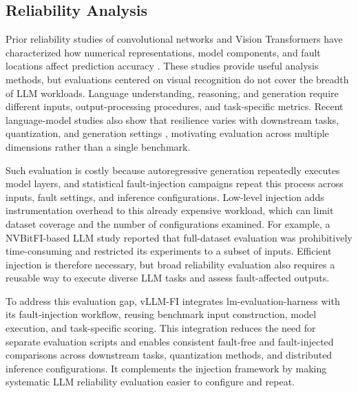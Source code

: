 \subsection{Reliability Analysis}

Prior reliability studies of convolutional networks and Vision Transformers have characterized how numerical representations, model components, and fault locations affect prediction accuracy \cite{li2017understanding,mahmoud2020hardnn,xue2023soft,roquet2024cross}. These studies provide useful analysis methods, but evaluations centered on visual recognition do not cover the breadth of LLM workloads. Language understanding, reasoning, and generation require different inputs, output-processing procedures, and task-specific metrics. Recent language-model studies also show that resilience varies with downstream tasks, quantization, and generation settings \cite{agarwal2023resilience,sun2025demystifying,xie2025realm}, motivating evaluation across multiple dimensions rather than a single benchmark.

Such evaluation is costly because autoregressive generation repeatedly executes model layers, and statistical fault-injection campaigns repeat this process across inputs, fault settings, and inference configurations. Low-level injection adds instrumentation overhead to this already expensive workload, which can limit dataset coverage and the number of configurations examined. For example, a NVBitFI-based LLM study reported that full-dataset evaluation was prohibitively time-consuming and restricted its experiments to a subset of inputs. Efficient injection is therefore necessary, but broad reliability evaluation also requires a reusable way to execute diverse LLM tasks and assess fault-affected outputs.

To address this evaluation gap, vLLM-FI integrates lm-evaluation-harness with its fault-injection workflow, reusing benchmark input construction, model execution, and task-specific scoring. This integration reduces the need for separate evaluation scripts and enables consistent fault-free and fault-injected comparisons across downstream tasks, quantization methods, and distributed inference configurations. It complements the injection framework by making systematic LLM reliability evaluation easier to configure and repeat.



